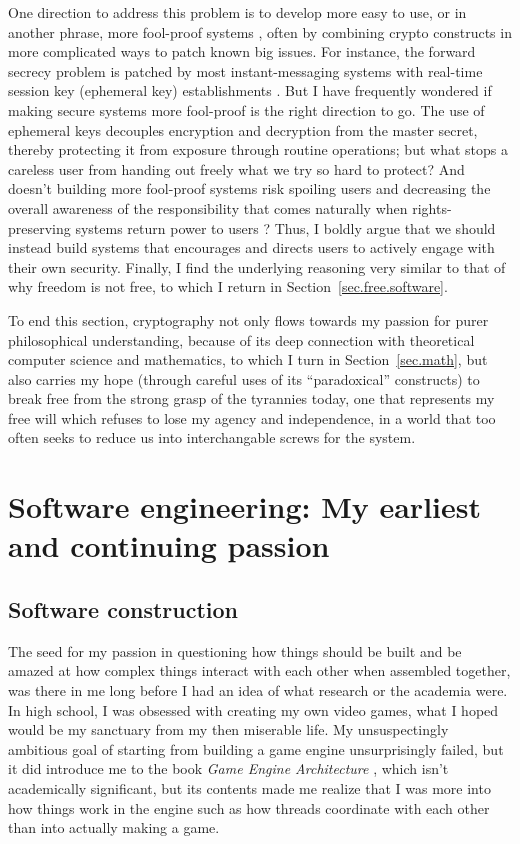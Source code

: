 \documentclass[10pt]{article}
\begin{document}
One direction to address this problem is to develop more easy to use, or in
another phrase, more fool-proof systems \cite{secure.systems.people.can.use},
often by combining crypto constructs in more complicated ways to patch known
big issues. For instance, the forward secrecy problem is patched by most
instant-messaging systems with real-time session key (ephemeral key)
establishments . But I have frequently wondered if making secure systems more
fool-proof is the right direction to go.  The use of ephemeral keys decouples
encryption and decryption from the master secret, thereby protecting it from
exposure through routine operations; but what stops a careless user from
handing out freely what we try so hard to protect? And doesn't building more
fool-proof systems risk spoiling users and decreasing the overall awareness of
the responsibility that comes naturally when rights-preserving systems return
power to users \cite{usable.security.contradiction,
rid.of.usability.sec.tradeoff}?  Thus, I boldly argue that we should instead
build systems that encourages and directs users to actively engage with their
own security.  Finally, I find the underlying reasoning very similar to that of
why freedom is not free, to which I return in Section~\ref{sec.free.software}.

To end this section, cryptography not only flows towards my passion for purer
philosophical understanding, because of its deep connection with theoretical
computer science and mathematics, to which I turn in Section~\ref{sec.math},
but also carries my hope (through careful uses of its ``paradoxical''
constructs) to break free from the strong grasp of the tyrannies today, one
that represents my free will which refuses to lose my agency and independence,
in a world that too often seeks to reduce us into interchangable screws for the
system.  

\section[Software engineering]{
Software engineering: My earliest and continuing passion}
\subsection{Software construction}
The seed for my passion in questioning how things should be built and be amazed
at how complex things interact with each other when assembled together, was
there in me long before I had an idea of what research or the academia were. In
high school, I was obsessed with creating my own video games, what I hoped
would be my sanctuary from my then miserable life. My unsuspectingly ambitious
goal of starting from building a game engine unsurprisingly failed, but it did
introduce me to the book \emph{Game Engine Architecture}
\cite{game.engine.arch}, which isn't academically significant, but its contents
made me realize that I was more into how things work in the engine such as how
threads coordinate with each other than into actually making a game.
\end{document}
